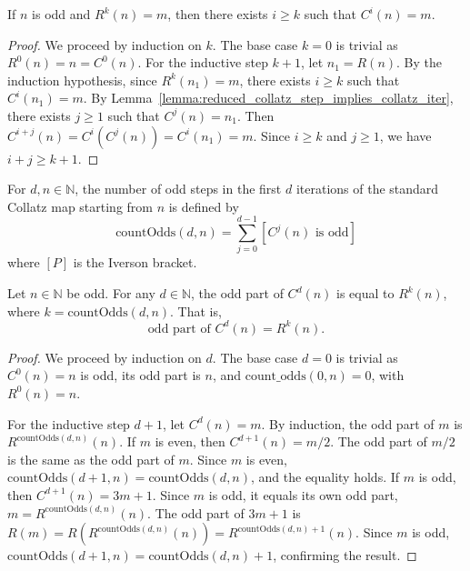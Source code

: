 \begin{lemma}\label{lemma:reduced_collatz_iter_implies_collatz_iter}\leanok
If $n$ is odd and $R^k(n) = m$, then there exists $i \ge k$ such that $C^i(n) = m$.
\end{lemma}
\begin{proof}\leanok
We proceed by induction on $k$. The base case $k=0$ is trivial as $R^0(n) = n = C^0(n)$.
For the inductive step $k+1$, let $n_1 = R(n)$. By the induction hypothesis, since $R^k(n_1) = m$, there exists $i \ge k$ such that $C^i(n_1) = m$.
By Lemma~\ref{lemma:reduced_collatz_step_implies_collatz_iter}, there exists $j \ge 1$ such that $C^j(n) = n_1$.
Then $C^{i+j}(n) = C^i(C^j(n)) = C^i(n_1) = m$.
Since $i \ge k$ and $j \ge 1$, we have $i+j \ge k+1$.
\end{proof}

\begin{definition}\label{def:count_odds}\leanok
For $d, n \in \mathbb{N}$, the number of odd steps in the first $d$ iterations of the standard Collatz map starting from $n$ is defined by
\begin{equation}
    \text{countOdds}(d, n) = \sum_{j=0}^{d-1} [C^j(n) \text{ is odd}]
\end{equation}
where $[P]$ is the Iverson bracket.
\end{definition}

\begin{lemma}\label{lemma:ordCompl_collatz_iter}\leanok
Let $n \in \mathbb{N}$ be odd. For any $d \in \mathbb{N}$, the odd part of $C^d(n)$ is equal to $R^k(n)$, where $k = \text{countOdds}(d, n)$. That is,
\begin{equation}
    \text{odd part of } C^d(n) = R^k(n).
\end{equation}
\end{lemma}
\begin{proof}\leanok
We proceed by induction on $d$. The base case $d=0$ is trivial as $C^0(n) = n$ is odd, its odd part is $n$, and $\text{count\_odds}(0, n) = 0$, with $R^0(n) = n$.

For the inductive step $d+1$, let $C^d(n) = m$. By induction, the odd part of $m$ is $R^{\text{countOdds}(d, n)}(n)$.
If $m$ is even, then $C^{d+1}(n) = m/2$. The odd part of $m/2$ is the same as the odd part of $m$.
Since $m$ is even, $\text{countOdds}(d+1, n) = \text{countOdds}(d, n)$, and the equality holds.
If $m$ is odd, then $C^{d+1}(n) = 3m+1$. Since $m$ is odd, it equals its own odd part, $m = R^{\text{countOdds}(d, n)}(n)$.
The odd part of $3m+1$ is $R(m) = R(R^{\text{countOdds}(d, n)}(n)) = R^{\text{countOdds}(d, n) + 1}(n)$.
Since $m$ is odd, $\text{countOdds}(d+1, n) = \text{countOdds}(d, n) + 1$, confirming the result.
\end{proof}

